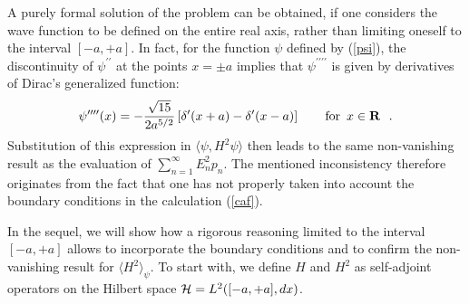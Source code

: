 \documentclass[12pt]{report}
\def\underline{\relax}
\begin{document}
\underline{{\bf (7)}}
A purely formal solution of the problem can be obtained,
if one considers the wave function to be defined 
on the entire real axis, rather than
limiting oneself to the interval $[-a, +a]$.
In fact, for the function $\psi$ defined by (\ref{psi}),
the discontinuity of 
$\psi^{\prime \prime}$ at the points $x = \pm a$ implies that 
$\psi^{\prime \prime \prime \prime}$ is given by derivatives 
of Dirac's generalized function: 
\[
\psi^{\prime \prime \prime \prime} (x) = -
{\sqrt{15} \over 2 a^{5/2}} \left[
\delta^{\prime} (x+a) - \delta^{\prime} (x-a) \right]
\qquad {\rm for} \ \, x \in {\bf R}
\ \ .
\]
Substitution of this expression in $\langle \psi , H^2 \psi \rangle$
then leads to the same non-vanishing result as the  
evaluation of $\sum_{n=1}^{\infty} E_n^2 p_n$.
The mentioned inconsistency therefore originates from the fact that 
one has not properly taken into account the boundary conditions 
in the calculation (\ref{caf}).

In the sequel, we will show 
how a rigorous reasoning limited to the interval 
$[-a , +a]$ allows to incorporate the boundary conditions 
and to confirm the non-vanishing result for 
$\langle H^2 \rangle_{\psi}$.
To start with, we define 
$H$ and $H^2$ as self-adjoint operators on the Hilbert space 
${\cal H} = L^2 ([-a,+a], dx)$.
 
\end{document}
